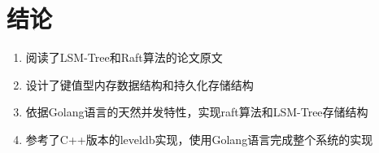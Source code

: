 \section*{结论}


	
	\begin{enumerate}[fullwidth,itemindent=2em,listparindent=2em]	
		
		\item 阅读了LSM-Tree和Raft算法的论文原文
		
		\item 设计了键值型内存数据结构和持久化存储结构
				
		\item 依据Golang语言的天然并发特性，实现raft算法和LSM-Tree存储结构
		
		\item 参考了C++版本的leveldb实现，使用Golang语言完成整个系统的实现

		 
	\end{enumerate}
	
\clearpage